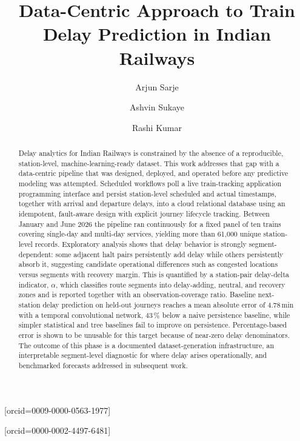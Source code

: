 \documentclass[a4paper,fleqn]{cas-dc}
\begin{document}
\let\WriteBookmarks\relax
\def\floatpagepagefraction{1}
\def\textpagefraction{.001}


\title[mode=title]{Data-Centric Approach to Train Delay Prediction in Indian Railways}

\author[1]{Arjun Sarje}[orcid=0009-0000-0563-1977]
\cormark[1]

\author[1]{Ashvin Sukaye}

\author[1]{Rashi Kumar}[orcid=0000-0002-4497-6481]



\begin{abstract}
Delay analytics for Indian Railways is constrained by the absence of a
reproducible, station-level, machine-learning-ready dataset. This work
addresses that gap with a data-centric pipeline that was designed, deployed,
and operated before any predictive modeling was attempted. Scheduled
workflows poll a live train-tracking application programming interface and
persist station-level scheduled and actual timestamps, together with arrival
and departure delays, into a cloud relational database using an idempotent,
fault-aware design with explicit journey lifecycle tracking. Between January
and June 2026 the pipeline ran continuously for a fixed panel of ten trains
covering single-day and multi-day services, yielding more than 61{,}000
unique station-level records. Exploratory analysis shows that delay behavior
is strongly segment-dependent: some adjacent halt pairs persistently add delay
while others persistently absorb it, suggesting candidate operational differences
such as congested locations versus segments with recovery margin. This is quantified
by a station-pair delay-delta indicator, $\alpha$, which classifies route
segments into delay-adding, neutral, and recovery zones and is reported
together with an observation-coverage ratio. Baseline next-station delay
prediction on held-out journeys reaches a mean absolute error of 4.78\,min
with a temporal convolutional network, 43\,\% below a naive persistence
baseline, while simpler statistical and tree baselines fail to improve on
persistence. Percentage-based error is shown to be unusable for this target
because of near-zero delay denominators. The outcome of this phase is a
documented dataset-generation infrastructure, an interpretable segment-level
diagnostic for where delay arises operationally, and benchmarked forecasts 
addressed in subsequent work.
\end{abstract}
\end{document}
